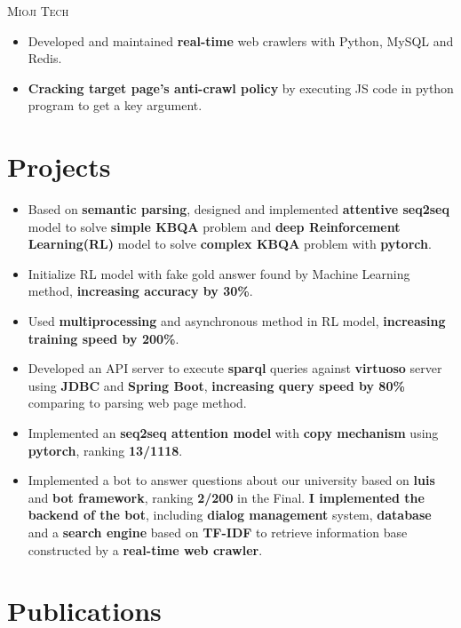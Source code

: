 \documentclass[11pt,a4paper]{moderncv}
\begin{document}
 {\textsc{Mioji Tech}}{}{}
{\begin{itemize}
\item Developed and maintained \textbf{real-time} web crawlers with Python, MySQL and Redis.
\item \textbf{Cracking target page's anti-crawl policy} by executing JS code in python program to get a key argument. 
\end{itemize}}


\section{Projects}
{
\begin{itemize}
\item Based on \textbf{semantic parsing}, designed and implemented \textbf{attentive seq2seq} model to solve \textbf{simple KBQA} problem and \textbf{deep Reinforcement Learning(RL)} model to solve \textbf{complex KBQA} problem with \textbf{pytorch}.
\item Initialize RL model with fake gold answer found by Machine Learning method, \textbf{increasing accuracy by 30\%}. 
\item Used \textbf{multiprocessing} and asynchronous method in RL model, \textbf{increasing training speed by 200\%}.
\item Developed an API server to execute \textbf{sparql} queries against \textbf{virtuoso} server using \textbf{JDBC} and \textbf{Spring Boot}, \textbf{increasing query speed by 80\%} comparing to parsing web page method.
\end{itemize}}

{
\begin{itemize}
\item Implemented an \textbf{seq2seq attention model} with \textbf{copy mechanism} using \textbf{pytorch}, ranking \textbf{13/1118}.
\item Implemented a bot to answer questions about our university based on \textbf{luis} and \textbf{bot framework}, ranking \textbf{2/200} in the Final. \textbf{I implemented the backend of the bot}, including \textbf{dialog management} system, \textbf{database} and a \textbf{search engine} based on \textbf{TF-IDF} to retrieve information base constructed by a \textbf{real-time web crawler}.
\end{itemize}}

\section{Publications}
\end{document}
